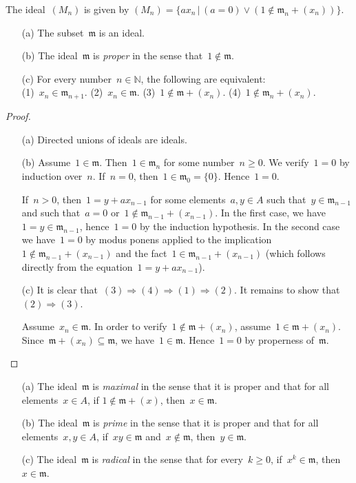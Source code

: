 \documentclass[envcountsect,envcountsame,runningheads]{llncs}
\newcommand{\mmm}{\mathfrak{m}}
\newcommand{\NN}{\mathbb{N}}
\renewcommand{\_}{\mathpunct{.}\,}
\begin{document}
The ideal~$(M_n)$ is given by
$(M_n) = \{ a x_n \,|\, (a = 0) \vee (1 \not\in \mmm_n + (x_n)) \}$.

\begin{lemma}\label{lemma:omnibus}
\begin{enumerate}
\item[\textnormal{(a)}] The subset~$\mmm$ is an ideal.
\item[\textnormal{(b)}] The ideal~$\mmm$ is \emph{proper} in the sense that~$1 \not\in \mmm$.
\item[\textnormal{(c)}] For every number~$n \in \NN$, the following are equivalent: \\
(1)~$x_n \in \mmm_{n+1}$.\quad
(2)~$x_n \in \mmm$.\quad
(3)~$1 \not\in \mmm + (x_n)$.\quad
(4)~$1 \not\in \mmm_n + (x_n)$.
\end{enumerate}
\end{lemma}

\begin{proof}\begin{enumerate}
\item[(a)] Directed unions of ideals are ideals.
\item[(b)] Assume~$1 \in \mmm$. Then~$1 \in \mmm_n$ for some number~$n \geq 0$. We
verify~$1 = 0$ by induction over~$n$.
If~$n = 0$, then~$1 \in \mmm_0 = \{0\}$. Hence~$1 = 0$.

If~$n > 0$, then~$1 = y + a x_{n-1}$ for some elements~$a,y \in A$ such that~$y
\in \mmm_{n-1}$ and such that~$a = 0$ or~$1 \not\in \mmm_{n-1} + (x_{n-1})$.
In the first case, we have~$1 = y \in \mmm_{n-1}$, hence~$1 = 0$ by the induction
hypothesis. In the second case we have~$1 = 0$ by modus ponens applied to the
implication~$1 \not\in \mmm_{n-1} + (x_{n-1})$ and the fact~$1 \in \mmm_{n-1} +
(x_{n-1})$ (which follows directly from the equation~$1 = y + a x_{n-1}$).
\item[(c)] It is clear that~$(3) \Rightarrow (4) \Rightarrow (1) \Rightarrow
(2)$. It remains to show that~$(2) \Rightarrow (3)$.

Assume~$x_n \in \mmm$. In order to verify~$1 \not\in \mmm + (x_n)$,
assume~$1 \in \mmm + (x_n)$. Since~$\mmm + (x_n) \subseteq \mmm$,
we have~$1 \in \mmm$. Hence~$1 = 0$ by properness of~$\mmm$.
\end{enumerate}\end{proof}

\begin{corollary}\label{cor:is-prime-max}
\begin{enumerate}
\item[\textnormal{(a)}] The ideal~$\mmm$ is \emph{maximal} in the sense that it is proper and that for
all elements~$x \in A$, if $1 \not\in \mmm + (x)$, then~$x \in \mmm$.
\item[\textnormal{(b)}] The ideal~$\mmm$ is \emph{prime} in the
sense that it is proper and that for
all elements~$x,y \in A$, if~$xy \in \mmm$ and~$x \not\in \mmm$, then~$y \in
\mmm$.
\item[\textnormal{(c)}] The ideal~$\mmm$ is \emph{radical} in the sense that for every~$k \geq 0$, if~$x^k \in
\mmm$, then~$x \in \mmm$.
\end{enumerate}
\end{corollary}
\end{document}
